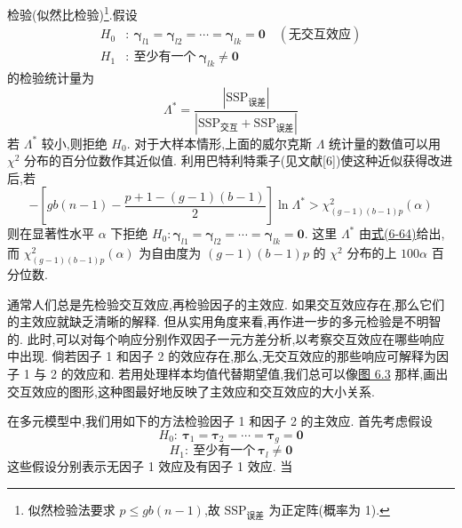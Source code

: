 检验(似然比检验)\footnote{似然检验法要求 $p\leqslant gb(n-1)$,故 $\mathrm{SSP}_{\text{误差}}$ 为正定阵(概率为 1).}.假设
\label{eq:6-63}
\begin{equation}
\begin{aligned}
H_0&:\ \boldsymbol{\gamma}_{l1}=\boldsymbol{\gamma}_{l2}=\cdots=\boldsymbol{\gamma}_{lk}=\mathbf{0}\quad(\text{无交互效应})\\
H_1&:\ \text{至少有一个}\ \boldsymbol{\gamma}_{lk}\neq\mathbf{0}
\end{aligned}
\tag{6-63}
\end{equation}
的检验统计量为
\label{eq:6-64}
\begin{equation}
\Lambda^{*}=\frac{|\mathrm{SSP}_{\text{误差}}|}{|\mathrm{SSP}_{\text{交互}}+\mathrm{SSP}_{\text{误差}}|}
\tag{6-64}
\end{equation}
若 $\Lambda^{*}$ 较小,则拒绝 $H_0$. 对于大样本情形,上面的威尔克斯 $\Lambda$ 统计量的数值可以用 $\chi^{2}$ 分布的百分位数作其近似值. 利用巴特利特乘子(见文献[6])使这种近似获得改进后,若
\label{eq:6-65}
\begin{equation}
-\left[gb(n-1)-\frac{p+1-(g-1)(b-1)}{2}\right]\ln\Lambda^{*}>\chi_{(g-1)(b-1)p}^{2}(\alpha)
\tag{6-65}
\end{equation}
则在显著性水平 $\alpha$ 下拒绝 $H_0:\boldsymbol{\gamma}_{l1}=\boldsymbol{\gamma}_{l2}=\cdots=\boldsymbol{\gamma}_{lk}=\mathbf{0}$. 这里 $\Lambda^{*}$ 由\hyperref[eq:6-64]{式(6-64)}给出,而 $\chi_{(g-1)(b-1)p}^{2}(\alpha)$ 为自由度为 $(g-1)(b-1)p$ 的 $\chi^{2}$ 分布的上 $100\alpha$ 百分位数.

通常人们总是先检验交互效应,再检验因子的主效应. 如果交互效应存在,那么它们的主效应就缺乏清晰的解释. 但从实用角度来看,再作进一步的多元检验是不明智的. 此时,可以对每个响应分别作双因子一元方差分析,以考察交互效应在哪些响应中出现. 倘若因子 1 和因子 2 的效应存在,那么,无交互效应的那些响应可解释为因子 1 与 2 的效应和. 若用处理样本均值代替期望值,我们总可以像\hyperref[fig:6.3]{图 6.3} 那样,画出交互效应的图形,这种图最好地反映了主效应和交互效应的大小关系.

在多元模型中,我们用如下的方法检验因子 1 和因子 2 的主效应. 首先考虑假设
\[
H_0:\ \boldsymbol{\tau}_1=\boldsymbol{\tau}_2=\cdots=\boldsymbol{\tau}_g=\mathbf{0}
\]
\[
H_1:\ \text{至少有一个}\ \boldsymbol{\tau}_l\neq\mathbf{0}
\]
这些假设分别表示无因子 1 效应及有因子 1 效应. 当
